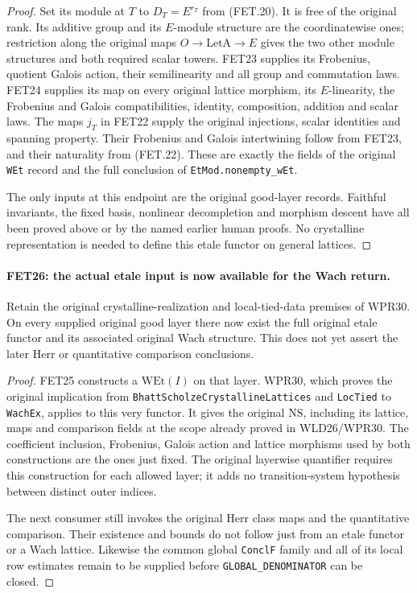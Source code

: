 \documentclass[11pt,a4paper]{article}
\numberwithin{equation}{section}
\theoremstyle{remark}\newtheorem{remark}[theorem]{Remark}
\begin{document}
\begin{proof}
Set its module at $T$ to $D_T=E^{r_T}$ from (FET.20).
It is free of the original rank. Its additive group and its
$E$-module structure are the coordinatewise ones; restriction
along the original maps $O\to\mathrm{LetA}\to E$ gives the
two other module structures and both required scalar towers.
FET23 supplies its Frobenius,
quotient Galois action, their semilinearity and all group and
commutation laws. FET24 supplies its map on every original
lattice morphism, its $E$-linearity, the Frobenius and Galois
compatibilities, identity, composition, addition and scalar laws.
The maps $j_T$ in FET22 supply the original injections, scalar
identities and spanning property. Their Frobenius and Galois
intertwining follow from FET23, and their naturality from
(FET.22). These are exactly the fields of the original
\texttt{WEt} record and the full conclusion of
\texttt{Et\allowbreak Mod.\allowbreak nonempty\_\allowbreak w\allowbreak Et}.

The only inputs at this endpoint are the original good-layer
records. Faithful invariants, the fixed basis, nonlinear
decompletion and morphism descent have all been proved above or
by the named earlier human proofs. No crystalline representation
is needed to define this etale functor on general lattices.
\end{proof}

\paragraph{FET26: the actual etale input is now available for the Wach return.}
\label{claim:FET26}
Retain the original crystalline-realization and local-tied-data
premises of WPR30. On every supplied original good layer there
now exist the full original etale functor and its associated
original Wach structure. This does not yet assert the later
Herr or quantitative comparison conclusions.

\begin{proof}
FET25 constructs a $\mathrm{WEt}(I)$ on that layer. WPR30,
which proves the original implication from
\texttt{Bhatt\allowbreak Scholze\allowbreak Crystalline\allowbreak Lattices} and \texttt{Loc\allowbreak Tied}
to \texttt{Wach\allowbreak Ex}, applies to this very functor. It gives
the original $\mathrm{NS}$, including its lattice, maps and
comparison fields at the scope already proved in WLD26/WPR30.
The coefficient inclusion, Frobenius, Galois action and lattice
morphisms used by both constructions are the ones just fixed.
The original layerwise quantifier requires this construction for
each allowed layer; it adds no transition-system hypothesis
between distinct outer indices.

The next consumer still invokes the original Herr class maps
and the quantitative comparison. Their existence and bounds do
not follow just from an etale functor or a Wach lattice. Likewise
the common global \texttt{Concl\allowbreak F} family and all of its local
row estimates remain to be supplied before
\texttt{GLOBAL\_\allowbreak DENOMINATOR} can be closed.
\end{proof}
\end{document}

